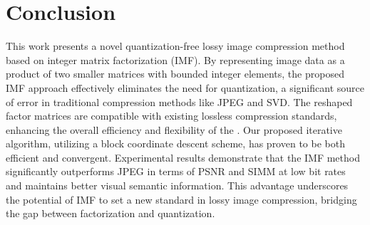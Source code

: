 \section{Conclusion} \label{sec:conclusion}

This work presents a novel quantization-free lossy image compression method based on integer matrix factorization (IMF). By representing image data as a product of two smaller matrices with bounded integer elements, the proposed IMF approach effectively eliminates the need for quantization, a significant source of error in traditional compression methods like JPEG and SVD. The reshaped factor matrices are compatible with existing lossless compression standards, enhancing the overall efficiency and flexibility of the . Our proposed iterative algorithm, utilizing a block coordinate descent scheme, has proven to be both efficient and convergent. Experimental results demonstrate that the IMF method significantly outperforms JPEG in terms of PSNR and SIMM at low bit rates and maintains better visual semantic information. This advantage underscores the potential of IMF to set a new standard in lossy image compression, bridging the gap between factorization and quantization.

